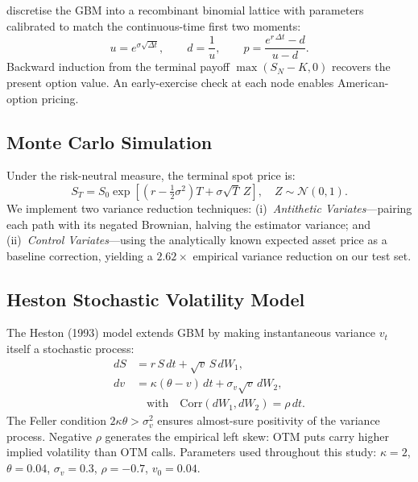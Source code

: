\documentclass[12pt,a4paper]{article}
\begin{document}
\citet{CRR1979} discretise the GBM into a recombinant binomial lattice with
parameters calibrated to match the continuous-time first two moments:
\begin{equation}
  u = e^{\sigma\sqrt{\Delta t}},\qquad d = \frac{1}{u},\qquad
  p = \frac{e^{r\,\Delta t} - d}{u - d}.
\end{equation}
Backward induction from the terminal payoff $\max(S_N - K,0)$ recovers the
present option value.
An early-exercise check at each node enables American-option pricing.

\subsection{Monte Carlo Simulation}

Under the risk-neutral measure, the terminal spot price is:
\begin{equation}
  S_T = S_0 \exp\!\left[\left(r - \tfrac{1}{2}\sigma^2\right)T
    + \sigma\sqrt{T}\,Z\right], \quad Z \sim \mathcal{N}(0,1).
\end{equation}
We implement two variance reduction techniques:
(i)~\textit{Antithetic Variates}—pairing each path with its negated
Brownian, halving the estimator variance; and
(ii)~\textit{Control Variates}—using the analytically known expected
asset price as a baseline correction, yielding a $2.62\times$ empirical
variance reduction on our test set.

\subsection{Heston Stochastic Volatility Model}

The Heston (1993) model extends GBM by making instantaneous variance $v_t$
itself a stochastic process:
\begin{align}
  dS &= r\,S\,dt + \sqrt{v}\,S\,dW_1, \label{eq:heston_s}\\
  dv &= \kappa(\theta - v)\,dt + \sigma_v\sqrt{v}\,dW_2, \label{eq:heston_v}\\
  &\quad\text{with}\quad \mathrm{Corr}(dW_1,dW_2) = \rho\,dt. \nonumber
\end{align}
The Feller condition $2\kappa\theta > \sigma_v^2$ ensures almost-sure positivity
of the variance process.
Negative $\rho$ generates the empirical left skew: OTM puts carry higher
implied volatility than OTM calls.
Parameters used throughout this study:
$\kappa=2$, $\theta=0.04$, $\sigma_v=0.3$, $\rho=-0.7$, $v_0=0.04$.

\end{document}
